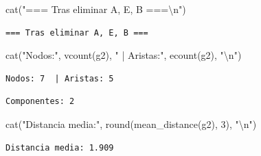 \documentclass[
  letterpaper,
  DIV=11,
  numbers=noendperiod]{scrreprt}
\newenvironment{Shaded}{\begin{snugshade}}{\end{snugshade}}
\newcommand{\DecValTok}[1]{\textcolor[rgb]{0.68,0.00,0.00}{#1}}
\newcommand{\FunctionTok}[1]{\textcolor[rgb]{0.28,0.35,0.67}{#1}}
\newcommand{\NormalTok}[1]{\textcolor[rgb]{0.00,0.23,0.31}{#1}}
\newcommand{\SpecialCharTok}[1]{\textcolor[rgb]{0.37,0.37,0.37}{#1}}
\newcommand{\StringTok}[1]{\textcolor[rgb]{0.13,0.47,0.30}{#1}}
\begin{document}
\begin{Shaded}
\begin{Highlighting}[]
\FunctionTok{cat}\NormalTok{(}\StringTok{"=== Tras eliminar A, E, B ===}\SpecialCharTok{\textbackslash{}n}\StringTok{"}\NormalTok{)}
\end{Highlighting}
\end{Shaded}

\begin{verbatim}
=== Tras eliminar A, E, B ===
\end{verbatim}

\begin{Shaded}
\begin{Highlighting}[]
\FunctionTok{cat}\NormalTok{(}\StringTok{"Nodos:"}\NormalTok{, }\FunctionTok{vcount}\NormalTok{(g2), }\StringTok{" | Aristas:"}\NormalTok{, }\FunctionTok{ecount}\NormalTok{(g2), }\StringTok{"}\SpecialCharTok{\textbackslash{}n}\StringTok{"}\NormalTok{)}
\end{Highlighting}
\end{Shaded}

\begin{verbatim}
Nodos: 7  | Aristas: 5 
\end{verbatim}

\begin{Shaded}
\end{Shaded}

\begin{verbatim}
Componentes: 2 
\end{verbatim}

\begin{Shaded}
\begin{Highlighting}[]
\FunctionTok{cat}\NormalTok{(}\StringTok{"Distancia media:"}\NormalTok{, }\FunctionTok{round}\NormalTok{(}\FunctionTok{mean\_distance}\NormalTok{(g2), }\DecValTok{3}\NormalTok{), }\StringTok{"}\SpecialCharTok{\textbackslash{}n}\StringTok{"}\NormalTok{)}
\end{Highlighting}
\end{Shaded}

\begin{verbatim}
Distancia media: 1.909 
\end{verbatim}
\end{document}
